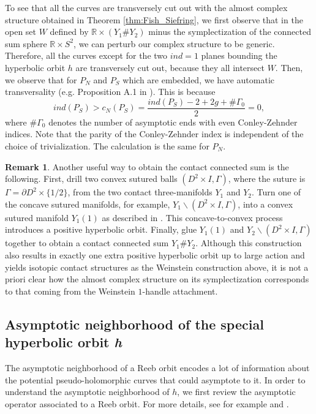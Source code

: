 \documentclass{article}
\numberwithin{equation}{section}
\theoremstyle{definition}
\newtheorem{remark}[theorem]{Remark}
\newcommand{\R}{\mathbb{R}}
\begin{document}
To see that all the curves are transversely cut out with the almost complex structure obtained in Theorem \ref{thm:Fish_Siefring}, we first observe that in the open set $W$ defined by $\R \times (Y_1 \# Y_2)$ minus the symplectization of the connected sum sphere $\mathbb{R}\times S^2$, we can perturb our complex structure to be generic. Therefore, all the curves except for the two $ind= 1$ planes bounding the hyperbolic orbit $h$ are transversely cut out, because they all intersect $W$. Then, we observe that for $P_N$ and $P_S$ which are embedded, we have automatic transversality (e.g. Proposition A.1 in \cite{wendl_strongly}). This is because $$ind(P_S)>c_N(P_S) = \frac{ind(P_S) -2 + 2 g +\# \Gamma_0}{2} = 0,$$
where $\# \Gamma_0$ denotes the number of asymptotic ends with even Conley-Zehnder indices. Note that the parity of the Conley-Zehnder index is independent of the choice of trivialization. The calculation is the same for $P_N$. 

\begin{remark}
Another useful way to obtain the contact connected sum is the following. First, drill two convex sutured balls $(D^2 \times I, \Gamma)$, where the suture is $\Gamma = \partial D^2 \times \{1/2\}$, from the two contact three-manifolds $Y_1$ and $Y_2$. Turn one of the concave sutured manifolds, for example, $Y_1 \backslash (D^2 \times I, \Gamma)$, into a convex sutured manifold $Y_1(1)$ as described in \cite{sutures}. This concave-to-convex process introduces a positive hyperbolic orbit. Finally, glue $Y_1(1)$ and $Y_2\backslash (D^2 \times I, \Gamma)$ together to obtain a contact connected sum $Y_1 \# Y_2$. Although this construction also results in exactly one extra positive hyperbolic orbit up to large action and yields isotopic contact structures as the Weinstein construction above, it is not a priori clear how the almost complex structure on its symplectization corresponds to that coming from the Weinstein $1$-handle attachment.
\end{remark}



\subsection{Asymptotic neighborhood of the special hyperbolic orbit \emph{h}}
\label{sec:asymptotic_h}
The asymptotic neighborhood of a Reeb orbit encodes a lot of information about the potential pseudo-holomorphic curves that could asymptote to it. In order to understand the asymptotic neighborhood of $h$, we first review the asymptotic operator associated to a Reeb orbit. For more details, see for example \cite{Siefring} and \cite{HT_gluing1}.
\end{document}
